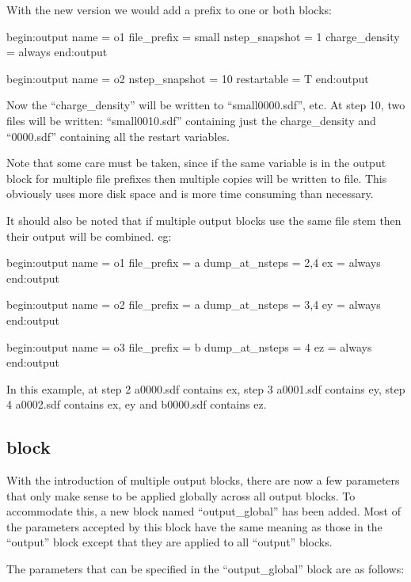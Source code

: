 With the new version we would add a prefix to one or both
blocks:
\begin{boxverbatim}
begin:output
   name = o1
   file_prefix = small
   nstep_snapshot = 1
   charge_density = always
end:output

begin:output
   name = o2
   nstep_snapshot = 10
   restartable = T
end:output
\end{boxverbatim}

Now the ``charge\_density'' will be written to ``small0000.sdf'', etc.
At step 10, two files will be written: ``small0010.sdf'' containing
just the charge\_density and ``0000.sdf'' containing all the restart
variables.

Note that some care must be taken, since if the same variable is
in the output block for multiple file prefixes then multiple
copies will be written to file. This obviously uses more disk
space and is more time consuming than necessary.

It should also be noted that if multiple output blocks use the
same file stem then their output will be combined. eg:
\begin{boxverbatim}
begin:output
   name = o1
   file_prefix = a
   dump_at_nsteps = 2,4
   ex = always
end:output

begin:output
   name = o2
   file_prefix = a
   dump_at_nsteps = 3,4
   ey = always
end:output

begin:output
   name = o3
   file_prefix = b
   dump_at_nsteps = 4
   ez = always
end:output
\end{boxverbatim}

In this example, at step 2 a0000.sdf contains ex, step 3 a0001.sdf
contains ey, step 4 a0002.sdf contains ex, ey and b0000.sdf
contains ez.


\subsection{\texorpdfstring
  { block}
  {           {output\_global} block}}
\label{sec:output_global_block}

With the introduction of multiple output blocks, there are now a few parameters
that only make sense to be applied globally across all output blocks. To
accommodate this, a new block named ``output\_global'' has been added.
Most of the parameters accepted by this block have the same meaning as those
in the ``output'' block except that they are applied to all ``output'' blocks.

The parameters that can be specified in the ``output\_global'' block are
as follows:\\

